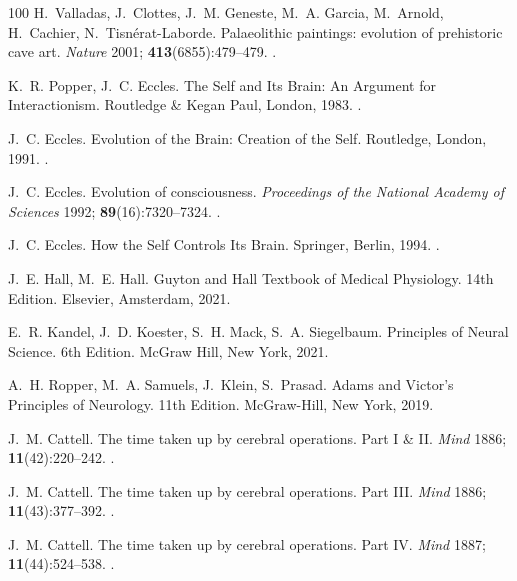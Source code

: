 \documentclass{ws-ijmpb}
\begin{document}
\begin{thebibliography}{100}
H.~Valladas, J.~Clottes, J.~M. Geneste, M.~A. Garcia, M.~Arnold, H.~Cachier,
  N.~Tisn\'{e}rat-Laborde. Palaeolithic paintings: evolution of prehistoric
  cave art. \emph{Nature} 2001; \textbf{413}(6855):479--479.
\newblock \href {http://doi.org/10.1038/35097160}
  {}.

K.~R. Popper, J.~C. Eccles. The Self and Its Brain: An Argument for
  Interactionism. Routledge \& Kegan Paul, London, 1983.
\newblock \href {http://doi.org/10.4324/9780203537480}
  {}.

J.~C. Eccles. Evolution of the Brain: Creation of the Self. Routledge, London,
  1991.
\newblock \href {http://doi.org/10.4324/9780203976661}
  {}.

J.~C. Eccles. Evolution of consciousness. \emph{Proceedings of the National
  Academy of Sciences} 1992; \textbf{89}(16):7320--7324.
\newblock \href {http://doi.org/10.1073/pnas.89.16.7320}
  {}.

J.~C. Eccles. How the Self Controls Its Brain. Springer, Berlin, 1994.
\newblock \href {http://doi.org/10.1007/978-3-642-49224-2}
  {}.

J.~E. Hall, M.~E. Hall. Guyton and Hall Textbook of Medical Physiology. 14th
  Edition. Elsevier, Amsterdam, 2021.

E.~R. Kandel, J.~D. Koester, S.~H. Mack, S.~A. Siegelbaum. Principles of Neural
  Science. 6th Edition. McGraw Hill, New York, 2021.

A.~H. Ropper, M.~A. Samuels, J.~Klein, S.~Prasad. Adams and Victor's Principles
  of Neurology. 11th Edition. McGraw-Hill, New York, 2019.

J.~M. Cattell. The time taken up by cerebral operations. {P}art {I} \& {II}.
  \emph{Mind} 1886; \textbf{11}(42):220--242.
\newblock \href {http://doi.org/10.1093/mind/os-XI.42.220}
  {}.

J.~M. Cattell. The time taken up by cerebral operations. {P}art {III}.
  \emph{Mind} 1886; \textbf{11}(43):377--392.
\newblock \href {http://doi.org/10.1093/mind/os-XI.43.377}
  {}.

J.~M. Cattell. The time taken up by cerebral operations. {P}art {IV}.
  \emph{Mind} 1887; \textbf{11}(44):524--538.
\newblock \href {http://doi.org/10.1093/mind/os-XI.44.524}
  {}.


\end{thebibliography}
\end{document}
